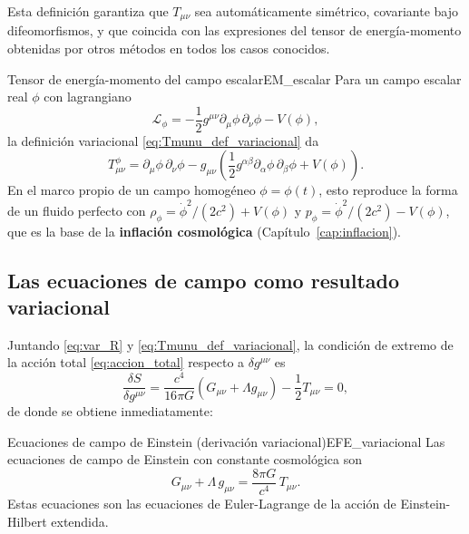 Esta definición garantiza que $T_{\mu\nu}$ sea automáticamente simétrico, covariante bajo difeomorfismos, y que coincida con las expresiones del tensor de energía-momento obtenidas por otros métodos en todos los casos conocidos.

\begin{ejemplo}{Tensor de energía-momento del campo escalar}{EM_escalar}
Para un campo escalar real $\phi$ con lagrangiano
\begin{equation}
  \mathcal{L}_\phi = -\frac{1}{2}g^{\mu\nu}\partial_\mu\phi\,\partial_\nu\phi - V(\phi),
\end{equation}
la definición variacional \eqref{eq:Tmunu_def_variacional} da
\begin{equation}
  T_{\mu\nu}^\phi = \partial_\mu\phi\,\partial_\nu\phi - g_{\mu\nu}\left(\frac{1}{2}g^{\alpha\beta}\partial_\alpha\phi\,\partial_\beta\phi + V(\phi)\right).
\end{equation}
En el marco propio de un campo homogéneo $\phi = \phi(t)$, esto reproduce la forma de un fluido perfecto con $\rho_\phi = \dot\phi^2/(2c^2) + V(\phi)$ y $p_\phi = \dot\phi^2/(2c^2) - V(\phi)$, que es la base de la \textbf{inflación cosmológica} (Capítulo~\ref{cap:inflacion}).
\end{ejemplo}

\subsection{Las ecuaciones de campo como resultado variacional}

Juntando \eqref{eq:var_R} y \eqref{eq:Tmunu_def_variacional}, la condición de extremo de la acción total \eqref{eq:accion_total} respecto a $\delta g^{\mu\nu}$ es
\begin{equation}
  \frac{\delta S}{\delta g^{\mu\nu}} = \frac{c^4}{16\pi G}\left(G_{\mu\nu} + \Lambda g_{\mu\nu}\right) - \frac{1}{2}T_{\mu\nu} = 0,
\end{equation}
de donde se obtiene inmediatamente:

\begin{teorema}{Ecuaciones de campo de Einstein (derivación variacional)}{EFE_variacional}
Las ecuaciones de campo de Einstein con constante cosmológica son
\begin{equation}
  G_{\mu\nu} + \Lambda\,g_{\mu\nu} = \frac{8\pi G}{c^4}\,T_{\mu\nu}.
  \label{eq:EFE}
\end{equation}
Estas ecuaciones son las ecuaciones de Euler-Lagrange de la acción de Einstein-Hilbert extendida.
\end{teorema}


